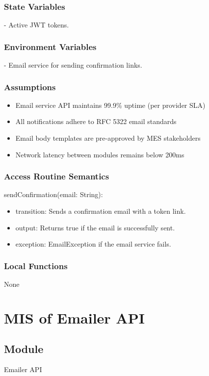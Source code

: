 \documentclass[12pt, titlepage]{article}
\begin{document}
\subsubsection{State Variables}
- Active JWT tokens.

\subsubsection{Environment Variables}
- Email service for sending confirmation links.

\subsubsection{Assumptions}
\begin{itemize}
  \item Email service API maintains 99.9\% uptime (per provider SLA)
  \item All notifications adhere to RFC 5322 email standards
  \item Email body templates are pre-approved by MES stakeholders
  \item Network latency between modules remains below 200ms
\end{itemize}

\subsubsection{Access Routine Semantics}
\noindent sendConfirmation(email: String):
\begin{itemize}
\item transition: Sends a confirmation email with a token link.
\item output: Returns true if the email is successfully sent.
\item exception: EmailException if the email service fails.
\end{itemize}

\subsubsection{Local Functions}
None

\section{MIS of Emailer API} \label{EmailerAPI}

\subsection{Module}
Emailer API
\end{document}
